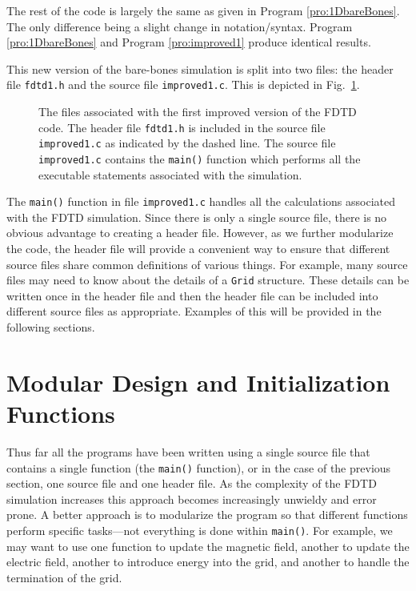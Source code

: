 The rest of the code is largely the same as given in Program
\ref{pro:1DbareBones}.  The only difference being a slight change in
notation/syntax.  Program \ref{pro:1DbareBones} and Program
\ref{pro:improved1} produce identical results.

This new version of the bare-bones simulation is split into two files:
the header file {\tt fdtd1.h} and the source file {\tt improved1.c}.
This is depicted in Fig.\ \ref{fig:improved1Files}.
\begin{figure}
  \begin{center}
  \end{center} \caption{The files associated with the first improved
  version of the FDTD code.  The header file {\tt fdtd1.h} is included
  in the source file {\tt improved1.c} as indicated by the dashed
  line.  The source file {\tt improved1.c} contains the {\tt main()}
  function which performs all the executable statements associated with
  the simulation.}  \label{fig:improved1Files}
\end{figure}
The {\tt main()} function in file {\tt improved1.c} handles all the
calculations associated with the FDTD simulation.  Since there is only
a single source file, there is no obvious advantage to creating a
header file.  However, as we further modularize the code, the header
file will provide a convenient way to ensure that different source
files share common definitions of various things.  For example, many
source files may need to know about the details of a {\tt Grid}
structure.  These details can be written once in the header file and
then the header file can be included into different source files as
appropriate.  Examples of this will be provided in the following
sections.


\section{Modular Design and Initialization Functions\label{sec:modularDesign}}

Thus far all the programs have been written using a single source file
that contains a single function (the {\tt main()} function), or in the
case of the previous section, one source file and one header file.  As
the complexity of the FDTD simulation increases this approach becomes
increasingly unwieldy and error prone.  A better approach is to
modularize the program so that different functions perform specific
tasks---not everything is done within {\tt main()}.  For example, we
may want to use one function to update the magnetic field, another to
update the electric field, another to introduce energy into the grid,
and another to handle the termination of the grid.

